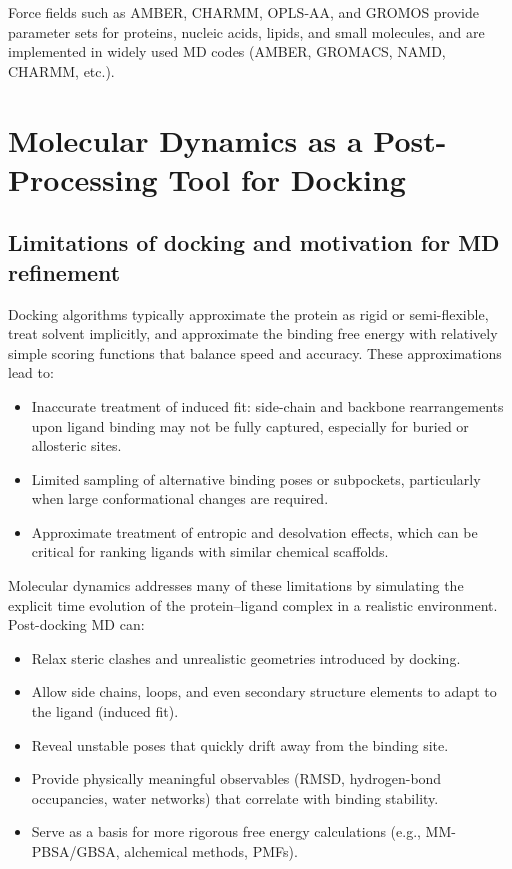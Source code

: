 \documentclass[12pt,a4paper]{article}
\begin{document}
Force fields such as AMBER, CHARMM, OPLS-AA, and GROMOS provide parameter sets for proteins, nucleic acids, lipids, and small molecules, and are implemented in widely used MD codes (AMBER, GROMACS, NAMD, CHARMM, etc.).\cite{Case2020,Abraham2015,Phillips2020}

\section{Molecular Dynamics as a Post-Processing Tool for Docking}

\subsection{Limitations of docking and motivation for MD refinement}

Docking algorithms typically approximate the protein as rigid or semi-flexible, treat solvent implicitly, and approximate the binding free energy with relatively simple scoring functions that balance speed and accuracy.\cite{Kitchen2004,Pagadala2017} These approximations lead to:

\begin{itemize}
\item Inaccurate treatment of induced fit: side-chain and backbone rearrangements upon ligand binding may not be fully captured, especially for buried or allosteric sites.
\item Limited sampling of alternative binding poses or subpockets, particularly when large conformational changes are required.
\item Approximate treatment of entropic and desolvation effects, which can be critical for ranking ligands with similar chemical scaffolds.
\end{itemize}

Molecular dynamics addresses many of these limitations by simulating the explicit time evolution of the protein--ligand complex in a realistic environment. Post-docking MD can:

\begin{itemize}
\item Relax steric clashes and unrealistic geometries introduced by docking.
\item Allow side chains, loops, and even secondary structure elements to adapt to the ligand (induced fit).
\item Reveal unstable poses that quickly drift away from the binding site.
\item Provide physically meaningful observables (RMSD, hydrogen-bond occupancies, water networks) that correlate with binding stability.
\item Serve as a basis for more rigorous free energy calculations (e.g., MM-PBSA/GBSA, alchemical methods, PMFs).
\end{itemize}
\end{document}

